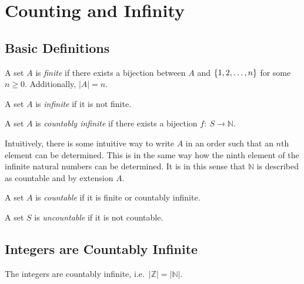 \section{Counting and Infinity}

\subsection{Basic Definitions}

\begin{definition}
    A set \(A\) is \emph{finite} if there exists a bijection between \(A\) and \(\{1,2,\dots,n\}\) for some \(n\ge0\).
    Additionally, \(|A|=n\).
\end{definition}

\bigskip
\begin{definition}
    A set \(A\) is \emph{infinite} if it is not finite.
\end{definition}

\bigskip
\begin{definition}
    A set \(A\) is \emph{countably infinite} if there exists a bijection \(f:\:S\rightarrow\mathbb{N}\). 
\end{definition}

Intuitively, there is some intuitive way to write \(A\) in an order such that an \(n\)th element can be determined.
This is in the same way how the ninth element of the infinite natural numbers can be determined. It is in this
sense that \(\mathbb{N}\) is described as countable and by extension \(A\). 

\bigskip
\begin{definition}
    A set \(A\) is \emph{countable} if it is finite or countably infinite.
\end{definition}

\bigskip
\begin{definition}
    A set \(S\) is \emph{uncountable} if it is not countable.
\end{definition}

\subsection{Integers are Countably Infinite}

\begin{proposition}
    The integers are countably infinite, i.e.\ \(|\mathbb{Z}|=|\mathbb{N}|\).
\end{proposition}

